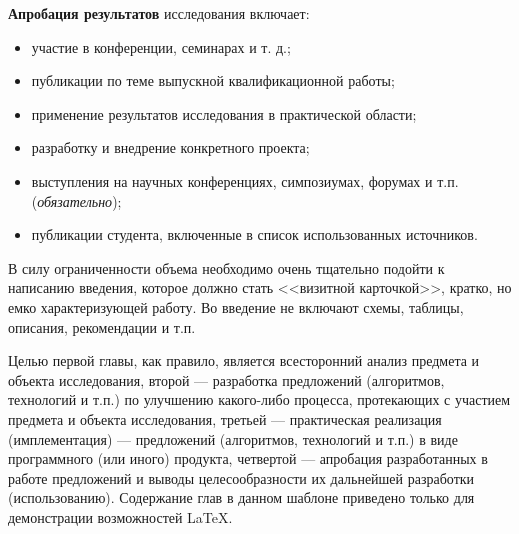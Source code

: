 \textbf{Апробация результатов} исследования включает:
\begin{itemize}
	\item участие в конференции, семинарах и т. д.;
	\item публикации по теме выпускной квалификационной работы;
	\item применение результатов исследования в практической области;
	\item разработку и внедрение конкретного проекта;
	\item выступления на научных конференциях, симпозиумах, форумах и т.п. (\textit{обязательно});
	\item публикации студента, включенные в список использованных источников. 
\end{itemize}


В силу ограниченности объема необходимо очень тщательно подойти к написанию введения, которое должно стать <<визитной карточкой>>, кратко, но емко характеризующей работу. Во введение не включают схемы, таблицы, описания, рекомендации и т.п. 

Целью первой главы, как правило, является всесторонний анализ предмета и объекта исследования, второй --- разработка предложений (алгоритмов, технологий и т.п.) по улучшению какого-либо процесса, протекающих с участием предмета и объекта исследования, третьей --- практическая реализация (имплементация) --- предложений (алгоритмов, технологий и т.п.) в виде программного (или иного) продукта, четвертой --- апробация разработанных в работе предложений и выводы целесообразности их дальнейшей разработки (использованию). 
Содержание глав в данном шаблоне приведено только для демонстрации возможностей \LaTeX.


